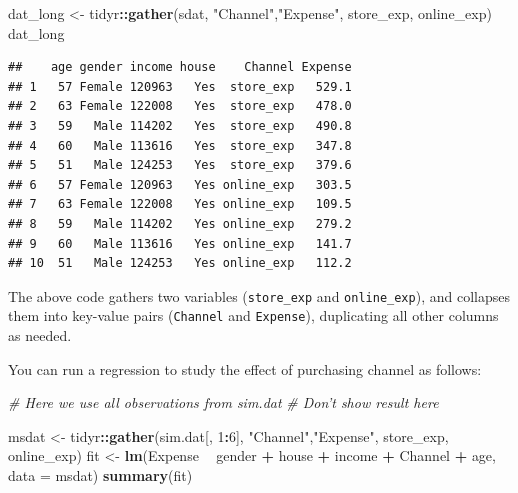 \documentclass[12pt,]{krantz}
\makeatletter
\newenvironment{Shaded}{\begin{snugshade}}{\end{snugshade}}
\newcommand{\CommentTok}[1]{\textcolor[rgb]{0.37,0.37,0.37}{\textit{#1}}}
\newcommand{\DataTypeTok}[1]{\textcolor[rgb]{0.27,0.27,0.27}{#1}}
\newcommand{\DecValTok}[1]{\textcolor[rgb]{0.06,0.06,0.06}{#1}}
\newcommand{\KeywordTok}[1]{\textcolor[rgb]{0.27,0.27,0.27}{\textbf{#1}}}
\newcommand{\NormalTok}[1]{#1}
\newcommand{\OperatorTok}[1]{\textcolor[rgb]{0.43,0.43,0.43}{\textbf{#1}}}
\newcommand{\StringTok}[1]{\textcolor[rgb]{0.5,0.5,0.5}{#1}}
\newenvironment{kframe}{%
\medskip{}
\setlength{\fboxsep}{.8em}
 \def\at@end@of@kframe{}%
 \ifinner\ifhmode%
  \def\at@end@of@kframe{\end{minipage}}%
  \begin{minipage}{\columnwidth}%
 \fi\fi%
 \def\FrameCommand##1{\hskip\@totalleftmargin \hskip-\fboxsep
 \colorbox{shadecolor}{##1}\hskip-\fboxsep
     \hskip-\linewidth \hskip-\@totalleftmargin \hskip\columnwidth}%
 \MakeFramed {\advance\hsize-\width
   \@totalleftmargin\z@ \linewidth\hsize
   \@setminipage}}%
 {\par\unskip\endMakeFramed%
 \at@end@of@kframe}
\renewenvironment{Shaded}{\begin{kframe}}{\end{kframe}}
\makeatother
\begin{document}
\begin{Shaded}
\begin{Highlighting}[]
\NormalTok{dat_long <-}\StringTok{ }\NormalTok{tidyr}\OperatorTok{::}\KeywordTok{gather}\NormalTok{(sdat, }\StringTok{"Channel"}\NormalTok{,}\StringTok{"Expense"}\NormalTok{, }
\NormalTok{                       store_exp, online_exp)}
\NormalTok{dat_long}
\end{Highlighting}
\end{Shaded}

\begin{verbatim}
##    age gender income house    Channel Expense
## 1   57 Female 120963   Yes  store_exp   529.1
## 2   63 Female 122008   Yes  store_exp   478.0
## 3   59   Male 114202   Yes  store_exp   490.8
## 4   60   Male 113616   Yes  store_exp   347.8
## 5   51   Male 124253   Yes  store_exp   379.6
## 6   57 Female 120963   Yes online_exp   303.5
## 7   63 Female 122008   Yes online_exp   109.5
## 8   59   Male 114202   Yes online_exp   279.2
## 9   60   Male 113616   Yes online_exp   141.7
## 10  51   Male 124253   Yes online_exp   112.2
\end{verbatim}

The above code gathers two variables (\texttt{store\_exp} and \texttt{online\_exp}), and collapses them into key-value pairs (\texttt{Channel} and \texttt{Expense}), duplicating all other columns as needed.

You can run a regression to study the effect of purchasing channel as follows:

\begin{Shaded}
\begin{Highlighting}[]
\CommentTok{# Here we use all observations from sim.dat}
\CommentTok{# Don't show result here}

\NormalTok{msdat <-}\StringTok{ }\NormalTok{tidyr}\OperatorTok{::}\KeywordTok{gather}\NormalTok{(sim.dat[, }\DecValTok{1}\OperatorTok{:}\DecValTok{6}\NormalTok{], }\StringTok{"Channel"}\NormalTok{,}\StringTok{"Expense"}\NormalTok{, }
\NormalTok{                       store_exp, online_exp)}
\NormalTok{fit <-}\StringTok{ }\KeywordTok{lm}\NormalTok{(Expense }\OperatorTok{~}\StringTok{ }\NormalTok{gender }\OperatorTok{+}\StringTok{ }\NormalTok{house }\OperatorTok{+}\StringTok{ }\NormalTok{income }\OperatorTok{+}\StringTok{ }\NormalTok{Channel }\OperatorTok{+}\StringTok{ }\NormalTok{age, }
          \DataTypeTok{data =}\NormalTok{ msdat)}
\KeywordTok{summary}\NormalTok{(fit)}
\end{Highlighting}
\end{Shaded}
\end{document}
